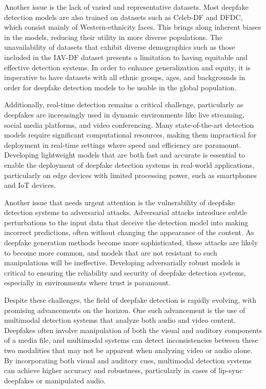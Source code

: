 \documentclass[lettersize,journal]{IEEEtran}
\begin{document}
Another issue is the lack of varied and representative datasets. Most deepfake detection models are also trained on datasets such as Celeb-DF and DFDC, which consist mainly of Western-ethnicity faces. This brings along inherent biases in the models, reducing their utility in more diverse populations. The unavailability of datasets that exhibit diverse demographics such as those included in the IAV-DF dataset presents a limitation to having equitable and effective detection systems. In order to enhance generalization and equity, it is imperative to have datasets with all ethnic groups, ages, and backgrounds in order for deepfake detection models to be usable in the global population.

Additionally, real-time detection remains a critical challenge, particularly as deepfakes are increasingly used in dynamic environments like live streaming, social media platforms, and video conferencing. Many state-of-the-art detection models require significant computational resources, making them impractical for deployment in real-time settings where speed and efficiency are paramount. Developing lightweight models that are both fast and accurate is essential to enable the deployment of deepfake detection systems in real-world applications, particularly on edge devices with limited processing power, such as smartphones and IoT devices.

Another issue that needs urgent attention is the vulnerability of deepfake detection systems to adversarial attacks. Adversarial attacks introduce subtle perturbations to the input data that deceive the detection model into making incorrect predictions, often without changing the appearance of the content. As deepfake generation methods become more sophisticated, these attacks are likely to become more common, and models that are not resistant to such manipulations will be ineffective. Developing adversarially robust models is critical to ensuring the reliability and security of deepfake detection systems, especially in environments where trust is paramount.\cite{vahdati2024beyond}

Despite these challenges, the field of deepfake detection is rapidly evolving, with promising advancements on the horizon. One such advancement is the use of multimodal detection systems that analyze both audio and video content. Deepfakes often involve manipulation of both the visual and auditory components of a media file, and multimodal systems can detect inconsistencies between these two modalities that may not be apparent when analyzing video or audio alone. By incorporating both visual and auditory cues, multimodal detection systems can achieve higher accuracy and robustness, particularly in cases of lip-sync deepfakes or manipulated audio.
\end{document}
